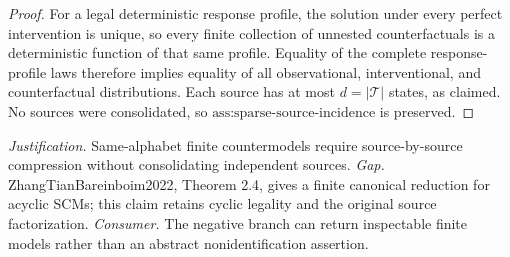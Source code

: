 \documentclass{article}
\begin{document}
\begin{proof}
For a legal deterministic response profile, the solution under every perfect intervention is unique, so every finite collection of unnested counterfactuals is a deterministic function of that same profile.  Equality of the complete response-profile laws therefore implies equality of all observational, interventional, and counterfactual distributions.  Each source has at most \(d=|\mathcal T|\) states, as claimed.  No sources were consolidated, so \(\text{ass:sparse-source-incidence}\) is preserved.
\end{proof}
\par\smallskip\noindent \textit{Justification.} Same-alphabet finite countermodels require source-by-source compression without consolidating independent sources. \textit{Gap.} ZhangTianBareinboim2022, Theorem 2.4, gives a finite canonical reduction for acyclic SCMs; this claim retains cyclic legality and the original source factorization. \textit{Consumer.} The negative branch can return inspectable finite models rather than an abstract nonidentification assertion.
\end{document}
